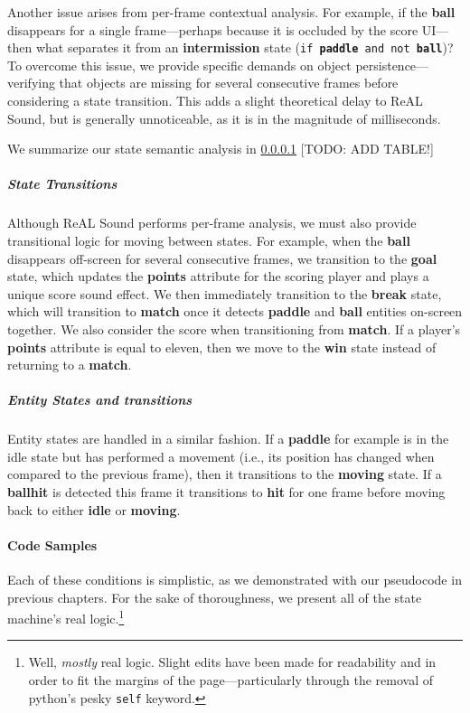 \documentclass{report}
\newcommand{\rs}{ReAL Sound\xspace}
\newcommand{\state}[1]{\textbf{#1}}
\newcommand{\pad}{\textbf{paddle}\xspace}
\newcommand{\ball}{\textbf{ball}\xspace}
\newcommand{\tech}[1]{\textbf{#1}}
\begin{document}
Another issue arises from per-frame contextual analysis. For example, if the \ball disappears for a single frame---perhaps because it is occluded by the score UI---then what separates it from an \state{intermission} state (\texttt{if \pad and not \ball})? To overcome this issue, we provide specific demands on object persistence---verifying that objects are missing for several consecutive frames before considering a state transition. This adds a slight theoretical delay to \rs, but is generally unnoticeable, as it is in the magnitude of milliseconds.



We summarize our state semantic analysis in \ref{} [TODO: ADD TABLE!]


\subparagraph{State Transitions}
Although \rs performs per-frame analysis, we must also provide transitional logic for moving between states. For example, when the \ball disappears off-screen for several consecutive frames, we transition to the \state{goal} state, which updates the \tech{points} attribute for the scoring player and plays a unique score sound effect. We then immediately transition to the \state{break} state, which will transition to \state{match} once it detects \pad and \ball entities on-screen together. We also consider the score when transitioning from \state{match}. If a player's \state{points} attribute is equal to eleven, then we move to the \state{win} state instead of returning to a \state{match}.

\subparagraph{Entity States and transitions}
Entity states are handled in a similar fashion. If a \pad for example is in the idle state but has performed a movement (i.e., its position has changed when compared to the previous frame), then it transitions to the \state{moving} state. If a \ball \state{hit} is detected this frame it transitions to \state{hit} for one frame before moving back to either \state{idle} or \state{moving}.

\paragraph{Code Samples}
Each of these conditions is simplistic, as we demonstrated with our pseudocode in previous chapters. For the sake of thoroughness, we present all of the state machine's real logic.\footnote{Well, \emph{mostly} real logic. Slight edits have been made for readability and in order to fit the margins of the page---particularly through the removal of python's pesky \texttt{self} keyword.}
\end{document}
